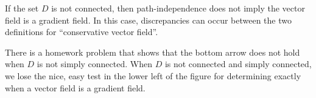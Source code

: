If the set $D$ is not connected, then path-independence does not imply
the vector field is a gradient field.  In this case, discrepancies can
occur between the two definitions for ``conservative vector field''.

There is a homework problem that shows that the bottom arrow
does not hold when $D$ is not simply connected.  When $D$ is not
connected and simply  connected, we lose the nice, easy test in the
lower left of the figure for determining exactly when a vector field
is a gradient field.






